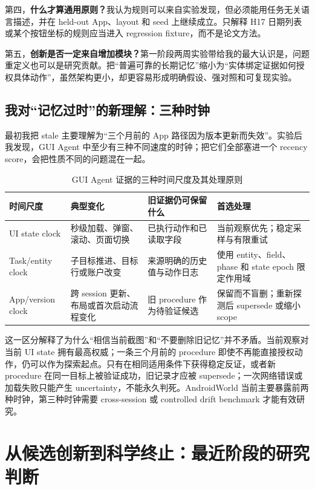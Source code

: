 \documentclass[12pt,a4paper]{ctexart}
\begin{document}
第四，\textbf{什么才算通用原则？}我认为规则可以来自实验发现，但必须能用任务无关语言描述，并在 held-out App、layout 和 seed 上继续成立。只解释 H17 日期列表或某个按钮坐标的规则应当进入 regression fixture，而不是论文方法。

第五，\textbf{创新是否一定来自增加模块？}第一阶段两周实验带给我的最大认识是，问题重定义也可以是研究贡献。把“普遍可靠的长期记忆”缩小为“实体绑定证据如何授权具体动作”，虽然架构更小，却更容易形成明确假设、强对照和可复现实验。

\subsection{我对“记忆过时”的新理解：三种时钟}

最初我把 stale 主要理解为“三个月前的 App 路径因为版本更新而失效”。实验后我发现，GUI Agent 中至少有三种不同速度的时钟；把它们全部塞进一个 recency score，会把性质不同的问题混在一起。

\begin{table}[H]
    \centering
    \caption{GUI Agent 证据的三种时间尺度及其处理原则}
    \label{tab:three-clocks}
    \small
    \begin{tabularx}{\textwidth}{p{2.8cm}p{3.2cm}p{4.0cm}Y}
        \toprule
        时间尺度 & 典型变化 & 旧证据仍可保留什么 & 首选处理 \\
        \midrule
        UI state clock & 秒级加载、弹窗、滚动、页面切换 & 已执行动作和已读取字段 & 当前观察优先；稳定采样与有限重试 \\
        Task/entity clock & 子目标推进、目标行或账户改变 & 来源明确的历史值与动作日志 & 使用 entity、field、phase 和 state epoch 限定作用域 \\
        App/version clock & 跨 session 更新、布局或首次启动流程变化 & 旧 procedure 作为待验证候选 & 保留而不盲删；重新探测后 supersede 或缩小 scope \\
        \bottomrule
    \end{tabularx}
\end{table}

这一区分解释了为什么“相信当前截图”和“不要删除旧记忆”并不矛盾。当前观察对当前 UI state 拥有最高权威；一条三个月前的 procedure 即使不再能直接授权动作，仍可以作为探索起点。只有在相同适用条件下获得稳定反证，或者新 procedure 在同一目标上被验证成功，旧记录才应被 supersede；一次网络错误或加载失败只能产生 uncertainty，不能永久判死。AndroidWorld 当前主要暴露前两种时钟，第三种时钟需要 cross-session 或 controlled drift benchmark 才能有效研究。

\section{从候选创新到科学终止：最近阶段的研究判断}
\end{document}
